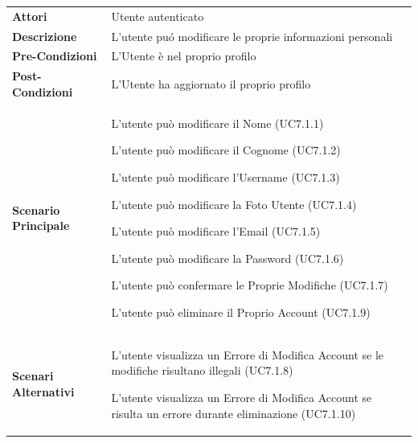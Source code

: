 \begin{longtable}{ l | p{11cm}}
	\hline
	\rowcolor{Gray}
	 \multicolumn{2}{c}{UC7.1 - Gestione Proprio Profilo Utente} \\
	 \hline
	 \textbf{Attori} & Utente autenticato  \\
	\textbf{Descrizione} & L’utente pu\'{o} modificare le proprie informazioni personali  \\
	\textbf{Pre-Condizioni} & L’Utente \`{e} nel proprio profilo \\
	\textbf{Post-Condizioni} & L’Utente ha aggiornato il proprio profilo \\
	\textbf{Scenario Principale} & 
	\begin{enumerate*}[label=(\arabic*.),itemjoin={\newline}]
		\item L'utente pu\`{o} modificare il Nome (UC7.1.1)
		\item L'utente pu\`{o} modificare il Cognome (UC7.1.2)
		\item L'utente pu\`{o} modificare l'Username (UC7.1.3)
		\item L'utente pu\`{o} modificare la Foto Utente (UC7.1.4)
		\item L'utente pu\`{o} modificare l'Email (UC7.1.5)
		\item L'utente pu\`{o} modificare la Password (UC7.1.6)
		\item L'utente pu\`{o} confermare le Proprie Modifiche (UC7.1.7)
		\item L'utente pu\`{o} eliminare il Proprio Account (UC7.1.9)
	\end{enumerate*}\\
	\textbf{Scenari Alternativi} & 
		\begin{enumerate*}[label=(\arabic*.),itemjoin={\newline}]
		\item L'utente visualizza un Errore di Modifica Account se le modifiche risultano illegali (UC7.1.8)
		\item L'utente visualizza un Errore di Modifica Account se risulta un errore durante eliminazione (UC7.1.10)
	\end{enumerate*}\\
\end{longtable}



